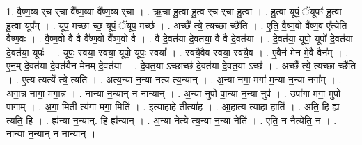 \documentclass[17pt]{extarticle}
\begin{document}
1. वै॒ष्ण॒व्य र्‌च र्‌चा वै᳚ष्ण॒व्या वै᳚ष्ण॒व्य र्‌चा । . ऋ॒चा हु॒त्वा हु॒त्व र्‌च र्‌चा हु॒त्वा । . हु॒त्वा यूपं॒ ॅयूपꣳ॑ हु॒त्वा हु॒त्वा यूप᳚म् । . यूप॒ मच्छा च्छ॒ यूपं॒ ॅयूप॒ मच्छ॑ । . अच्छै᳚ त्ये॒ त्यच्छा च्छै॑ति । . ए॒ति॒ वै॒ष्ण॒वो वै᳚ष्ण॒व ए᳚त्येति वैष्ण॒वः । . वै॒ष्ण॒वो वै वै वै᳚ष्ण॒वो वै᳚ष्ण॒वो वै । . वै दे॒वत॑या दे॒वत॑या॒ वै वै दे॒वत॑या । . दे॒वत॑या॒ यूपो॒ यूपो॑ दे॒वत॑या दे॒वत॑या॒ यूपः॑ । . यूपः॒ स्वया॒ स्वया॒ यूपो॒ यूपः॒ स्वया᳚ । . स्वयै॒वैव स्वया॒ स्वयै॒व । . ए॒वैन॑ मेन मे॒वै वैन᳚म् । . ए॒न॒म् दे॒वत॑या दे॒वत॑यैन मेनम् दे॒वत॑या । . दे॒वत॒या ऽच्छाच्छ॑ दे॒वत॑या दे॒वत॒या ऽच्छ॑ । . अच्छै᳚ त्ये॒ त्यच्छा च्छै॑ति । . ए॒त्य त्यत्ये᳚ त्ये॒ त्यति॑ । . अत्य॒न्या न॒न्या नत्य त्य॒न्यान् । . अ॒न्या नगा॒ मगा॑ म॒न्या न॒न्या नगा᳚म् । . अगा॒न्न नागा॒ मगा॒न्न । . नान्या न॒न्यान् न नान्यान् । . अ॒न्या नुपो पा॒न्या न॒न्या नुप॑ । . उपा॑गा मगा॒ मुपो पा॑गाम् । . अ॒गा॒ मिती त्य॑गा मगा॒ मिति॑ । . इत्या॑हा॒हे तीत्या॑ह । . आ॒हात्य त्या॑हा॒ हाति॑ । . अति॒ हि ह्य त्यति॒ हि । . ह्य॑न्या न॒न्यान्. हि ह्य॑न्यान् । . अ॒न्या नेत्ये त्य॒न्या न॒न्या नेति॑ । . एति॒ न नैत्येति॒ न । . नान्या न॒न्यान् न नान्यान् । \newline
\end{document}
